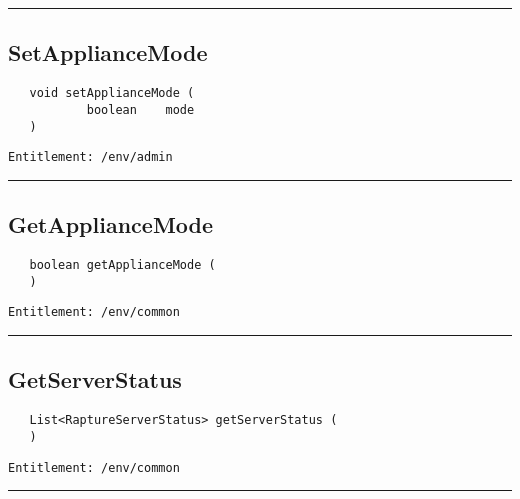 \rule{12cm}{2pt}
\subsection{SetApplianceMode}
\label{Api:SetApplianceMode}
\begin{Verbatim}
   void setApplianceMode (
           boolean    mode
   )
\end{Verbatim}
\begin{Verbatim}[formatcom=\color{Maroon}]
  Entitlement: /env/admin
\end{Verbatim}



\rule{12cm}{2pt}
\subsection{GetApplianceMode}
\label{Api:GetApplianceMode}
\begin{Verbatim}
   boolean getApplianceMode (
   )
\end{Verbatim}
\begin{Verbatim}[formatcom=\color{Maroon}]
  Entitlement: /env/common
\end{Verbatim}



\rule{12cm}{2pt}
\subsection{GetServerStatus}
\label{Api:GetServerStatus}
\begin{Verbatim}
   List<RaptureServerStatus> getServerStatus (
   )
\end{Verbatim}
\begin{Verbatim}[formatcom=\color{Maroon}]
  Entitlement: /env/common
\end{Verbatim}



\rule{12cm}{2pt}
